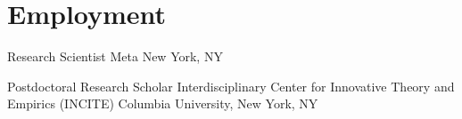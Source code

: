 
\section*{Employment}

  {Research Scientist}
  {
    Meta \newline
    New York, NY
  }{}

  {Postdoctoral Research Scholar}
  {
      Interdisciplinary Center for Innovative Theory and Empirics (INCITE) \newline
      Columbia University, New York, NY
  }{}